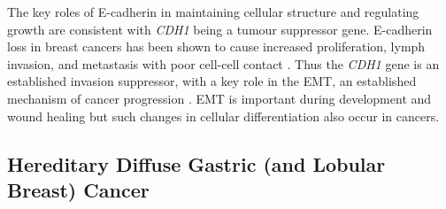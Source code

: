The key roles of \gls{E-cadherin} in maintaining cellular structure and regulating growth are consistent with \textit{CDH1} being a \gls{tumour suppressor} gene. %
%
\gls{E-cadherin} loss in breast cancers has been shown to cause increased proliferation, lymph  invasion, and metastasis with poor cell-cell contact \citep{Berx2009}. Thus the \textit{CDH1} gene is an established invasion suppressor, with a key role in the \gls{EMT}, an established mechanism of cancer progression \citep{Hanahan2011}. \gls{EMT} is important during development and wound healing but such changes in cellular differentiation also occur in cancers. %

\subsection{Hereditary Diffuse Gastric (and Lobular Breast) Cancer}


